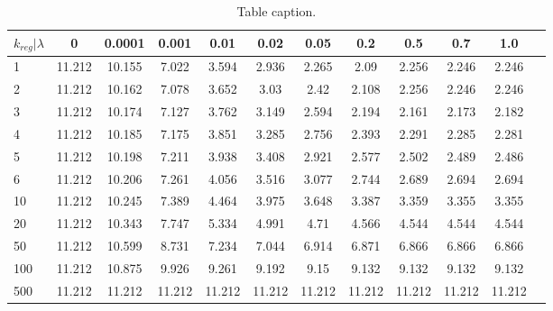\begin{table}[t] 
 
\centering 

\tiny 

\begin{tabular}{lccccccccccc} 

\toprule

$k_{reg} | \lambda$ & 0  & 0.0001  & 0.001  & 0.01  & 0.02  & 0.05  & 0.2  & 0.5  & 0.7  & 1.0 \\
\midrule
1 & 11.212  & 10.155  & 7.022  & 3.594  & 2.936  & 2.265  & 2.09  & 2.256  & 2.246  & 2.246 \\
2 & 11.212  & 10.162  & 7.078  & 3.652  & 3.03  & 2.42  & 2.108  & 2.256  & 2.246  & 2.246 \\
3 & 11.212  & 10.174  & 7.127  & 3.762  & 3.149  & 2.594  & 2.194  & 2.161  & 2.173  & 2.182 \\
4 & 11.212  & 10.185  & 7.175  & 3.851  & 3.285  & 2.756  & 2.393  & 2.291  & 2.285  & 2.281 \\
5 & 11.212  & 10.198  & 7.211  & 3.938  & 3.408  & 2.921  & 2.577  & 2.502  & 2.489  & 2.486 \\
6 & 11.212  & 10.206  & 7.261  & 4.056  & 3.516  & 3.077  & 2.744  & 2.689  & 2.694  & 2.694 \\
10 & 11.212  & 10.245  & 7.389  & 4.464  & 3.975  & 3.648  & 3.387  & 3.359  & 3.355  & 3.355 \\
20 & 11.212  & 10.343  & 7.747  & 5.334  & 4.991  & 4.71  & 4.566  & 4.544  & 4.544  & 4.544 \\
50 & 11.212  & 10.599  & 8.731  & 7.234  & 7.044  & 6.914  & 6.871  & 6.866  & 6.866  & 6.866 \\
100 & 11.212  & 10.875  & 9.926  & 9.261  & 9.192  & 9.15  & 9.132  & 9.132  & 9.132  & 9.132 \\
500 & 11.212  & 11.212  & 11.212  & 11.212  & 11.212  & 11.212  & 11.212  & 11.212  & 11.212  & 11.212 \\
\bottomrule
\end{tabular}
\caption{Table caption.}
\label{table:parameters}
\end{table}
